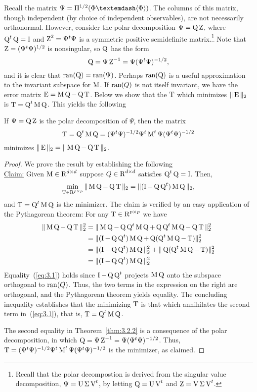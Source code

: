Recall the matrix $\Psi = \Pi^{1/2}(\Phi — \<\Phi\>)$. The columns of this
matrix, though independent (by choice of independent observables), are not
necessarily orthonormal. However, consider the polar decomposition 
$\Psi = \operatorname{Q} \operatorname{Z}$, where $\operatorname{Q}^t\operatorname{Q} = \operatorname{I}$ and $\operatorname{Z}^2 = \Psi^t\Psi$ is a symmetric
positive semidefinite matrix.\footnote{Recall that the polar decompostion is
  derived from the singular value decomposition, $\Psi = \operatorname{U}\Sigma \operatorname{V}^t$, by
  letting $\operatorname{Q} = \operatorname{U} \operatorname{V}^t$ and $\operatorname{Z} = \operatorname{V}\Sigma \operatorname{V}^t$.}
Note that $\operatorname{Z} = (\Psi^t\Psi)^{1/2}$ is nonsingular, so $\operatorname{Q}$ has the form
\[
\operatorname{Q} = \Psi \operatorname{Z}^{-1} = \Psi(\Psi^t\Psi)^{-1/2},
\]
and it is clear that $\operatorname{ran}(\operatorname{Q}) = \operatorname{ran}(\Psi)$. 
Perhaps $\operatorname{ran}(\operatorname{Q})$ is a useful approximation to the invariant
subspace for $\operatorname{M}$. If $\operatorname{ran}(Q)$ is not itself invariant, we have the error 
matrix $\operatorname{E} =\operatorname{M}\operatorname{Q} - \operatorname{Q}\operatorname{T}$.  Below we show that the
$\operatorname{T}$ which minimizes $\|\operatorname{E}\|_2$ is $\operatorname{T} = \operatorname{Q}^t\operatorname{M}\operatorname{Q}$. 
This yields the following
\begin{theorem}
\label{thm:3.2.2}  
If $\Psi = \operatorname{Q}\operatorname{Z}$ is the polar decomposition of $\Psi$, then the matrix
\[
\operatorname{T} = \operatorname{Q}^t\operatorname{M}\operatorname{Q} = (\Psi^t\Psi)^{-1/2}\Psi^t \operatorname{M}^t \Psi (\Psi^t\Psi)^{-1/2}
\]
minimizes $\|\operatorname{E}\|_2 = \|\operatorname{M}\operatorname{Q} - \operatorname{Q}\operatorname{T}\|_2$.
\end{theorem}
\begin{proof}
We prove the result by establishing the following
\\[6pt]
\underline{Claim:} Given $\operatorname{M} \in \operatorname{R}^{d\times d}$ suppose $Q \in  \operatorname{R}^{d\times d}$
satisfies $\operatorname{Q}^t\operatorname{Q} =\operatorname{I}$. 
Then,
\[
\min_{\operatorname{T}\in \operatorname{R}^{p\times p}} \|\operatorname{M}\operatorname{Q} - \operatorname{Q}\operatorname{T}\|_2 = \|(\operatorname{I}- \operatorname{Q}\operatorname{Q}^t)\operatorname{M}\operatorname{Q}\|_2,
\]
and $\operatorname{T} = \operatorname{Q}^t\operatorname{M}\operatorname{Q}$ is the minimizer.
%
%
%
%
The claim is verified by an easy application of the Pythagorean theorem:
For any $\operatorname{T} \in \operatorname{R}^{p\times p}$ we have
\begin{align}
\label{eq:3.1}
\|\M\Q - \Q\T\|^2_2 &= \|\M\Q - \Q\Q^t\M\Q + \Q\Q^t\M\Q - \Q\T\|^2_2 \nonumber\\
&=\|(\I - \Q\Q^t)\M\Q + \Q(\Q^t\M\Q - \T)\|^2_2 \nonumber \\
&=\|(\I - \Q\Q^t)\M\Q\|^2_2 + \|\Q(\Q^t\M\Q - \T)\|^2_2 \\
&=\|(\I - \Q\Q^t)\M\Q\|^2_2 \nonumber
\end{align}
Equality~(\ref{eq:3.1}) holds since $\operatorname{I} - \operatorname{Q}\operatorname{Q}^t$ projects $\operatorname{M}\operatorname{Q}$ onto the
subspace orthogonal to 
$\operatorname{ran}(Q)$. Thus, the two terms in the expression on the right are orthogonal,
and the Pythagorean theorem yields equality. The concluding inequality
establishes that the minimizing $\operatorname{T}$ is that which annihilates the 
second term in~(\ref{eq:3.1}), that is, $\operatorname{T} = \operatorname{Q}^t\operatorname{M}\operatorname{Q}$.

The second equality in Theorem~\ref{thm:3.2.2} is a consequence of the polar decomposition, in
which $\operatorname{Q} = \Psi \operatorname{Z}^{-1} = \Psi(\Psi^t\Psi)^{-1/2}$. Thus,
$\operatorname{T} = (\Psi^t\Psi)^{-1/2}\Psi^t \operatorname{M}^t \Psi (\Psi^t\Psi)^{-1/2}$
is the minimizer, as claimed.
\end{proof}

